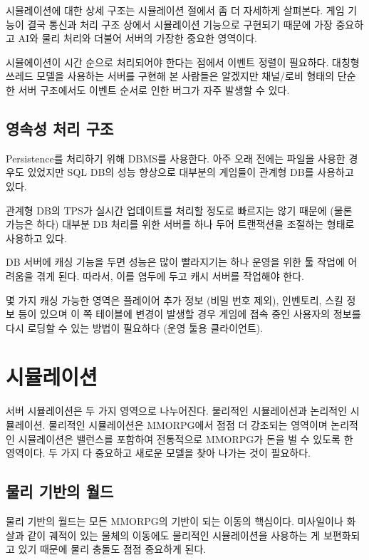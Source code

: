 \documentclass[chapter,kosection, 10.5pt, romanfixed, a4paper]{oblivoir}
\begin{document}
시뮬레이션에 대한 상세 구조는 시뮬레이션 절에서 좀 더 자세하게 살펴본다. 게임 기능이 
결국 통신과 처리 구조 상에서 시뮬레이션 기능으로 구현되기 때문에 가장 중요하고 AI와 
물리 처리와 더불어 서버의 가장한 중요한 영역이다. 

시뮬에이션이 시간 순으로 처리되어야 한다는 점에서 이벤트 정렬이 필요하다. 대칭형 쓰레드 모델을
사용하는 서버를 구현해 본 사람들은 알겠지만 채널/로비 형태의 단순한 서버 구조에서도 이벤트 순서로 
인한 버그가 자주 발생할 수 있다. 

\subsection{영속성 처리 구조}

Persistence를 처리하기 위해 DBMS를 사용한다. 아주 오래 전에는 파일을 사용한 경우도 있었지만
SQL DB의 성능 향상으로 대부분의 게임들이 관계형 DB를 사용하고 있다. 

관계형 DB의 TPS가 실시간 업데이트를 처리할 정도로 빠르지는 않기 때문에 (물론 가능은 하다)
대부분 DB 처리를 위한 서버를 하나 두어 트랜잭션을 조절하는 형태로 사용하고 있다. 

DB 서버에 캐싱 기능을 두면 성능은 많이 빨라지기는 하나 운영을 위한 툴 작업에 어려움을 
겪게 된다. 따라서, 이를 염두에 두고 캐시 서버를 작업해야 한다. 

몇 가지 캐싱 가능한 영역은 플레이어 추가 정보 (비밀 번호 제외), 인벤토리, 스킬 정보 등이 
있으며 이 쪽 테이블에 변경이 발생할 경우 게임에 접속 중인 사용자의 정보를 다시 로딩할 수 있는
방법이 필요하다 (운영 툴용 클라이언트).


\section{시뮬레이션}

서버 시뮬레이션은 두 가지 영역으로 나누어진다. 물리적인 시뮬레이션과 논리적인 시뮬레이션. 
물리적인 시뮬레이션은 MMORPG에서 점점 더 강조되는 영역이며 논리적인 시뮬레이션은 밸런스를
포함하여 전통적으로 MMORPG가 돈을 벌 수 있도록 한 영역이다. 두 가지 다 중요하고 새로운 모델을
찾아 나가는 것이 필요하다. 

\subsection{물리 기반의 월드}

물리 기반의 월드는 모든 MMORPG의 기반이 되는 이동의 핵심이다. 미사일이나 화살과 같이 
궤적이 있는 물체의 이동에도 물리적인 시뮬레이션을 사용하는 게 보편화되고 있기 때문에 
물리 충돌도 점점 중요하게 된다. 
\end{document}
